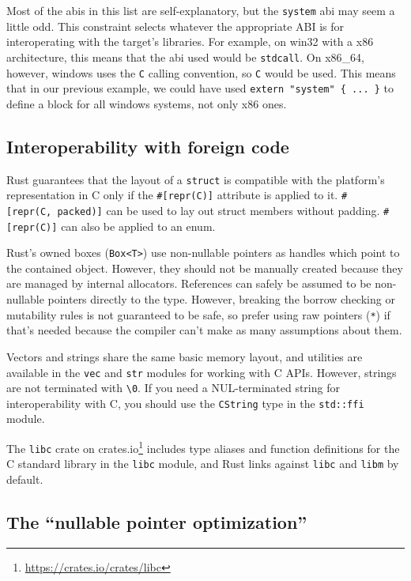 \documentclass[a4paper,]{book}
\renewcommand{\href}[2]{#2\footnote{\url{#1}}}
\begin{document}
Most of the abis in this list are self-explanatory, but the
\texttt{system} abi may seem a little odd. This constraint selects
whatever the appropriate ABI is for interoperating with the target's
libraries. For example, on win32 with a x86 architecture, this means
that the abi used would be \texttt{stdcall}. On x86\_64, however,
windows uses the \texttt{C} calling convention, so \texttt{C} would be
used. This means that in our previous example, we could have used
\texttt{extern\ "system"\ \{\ ...\ \}} to define a block for all windows
systems, not only x86 ones.

\subsection{Interoperability with foreign
code}\label{interoperability-with-foreign-code}

Rust guarantees that the layout of a \texttt{struct} is compatible with
the platform's representation in C only if the \texttt{\#{[}repr(C){]}}
attribute is applied to it. \texttt{\#{[}repr(C,\ packed){]}} can be
used to lay out struct members without padding. \texttt{\#{[}repr(C){]}}
can also be applied to an enum.

Rust's owned boxes (\texttt{Box\textless{}T\textgreater{}}) use
non-nullable pointers as handles which point to the contained object.
However, they should not be manually created because they are managed by
internal allocators. References can safely be assumed to be non-nullable
pointers directly to the type. However, breaking the borrow checking or
mutability rules is not guaranteed to be safe, so prefer using raw
pointers (\texttt{*}) if that's needed because the compiler can't make
as many assumptions about them.

Vectors and strings share the same basic memory layout, and utilities
are available in the \texttt{vec} and \texttt{str} modules for working
with C APIs. However, strings are not terminated with
\texttt{\textbackslash{}0}. If you need a NUL-terminated string for
interoperability with C, you should use the \texttt{CString} type in the
\texttt{std::ffi} module.

The \href{https://crates.io/crates/libc}{\texttt{libc} crate on
crates.io} includes type aliases and function definitions for the C
standard library in the \texttt{libc} module, and Rust links against
\texttt{libc} and \texttt{libm} by default.

\subsection{\texorpdfstring{The ``nullable pointer
optimization''}{The nullable pointer optimization}}\label{the-nullable-pointer-optimization}
\end{document}
